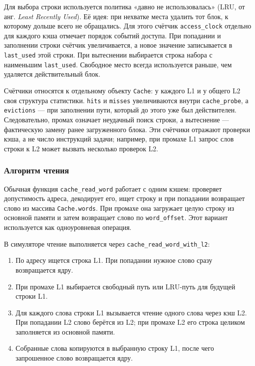 \documentclass[12pt,a4paper]{article}
\begin{document}
Для выбора строки используется политика «давно не использовалась» (LRU, от анг. \textit{Least Recently Used}). Её идея: при нехватке места удалить тот блок, к которому дольше всего не обращались. Для этого счётчик \texttt{access\_clock} отдельно для каждого кэша отмечает порядок событий доступа. При попадании и заполнении строки счётчик увеличивается, а новое значение записывается в \texttt{last\_used} этой строки. При вытеснении выбирается строка набора с наименьшим \texttt{last\_used}. Свободное место всегда используется раньше, чем удаляется действительный блок.

Счётчики относятся к отдельному объекту \texttt{Cache}: у каждого L1 и у общего L2 своя структура статистики. \texttt{hits} и \texttt{misses} увеличиваются внутри \texttt{cache\_probe}, а \texttt{evictions} --- при заполнении пути, который до этого уже был действителен. Следовательно, промах означает неудачный поиск строки, а вытеснение --- фактическую замену ранее загруженного блока. Эти счётчики отражают проверки кэша, а не число инструкций задачи; например, при промахе L1 запрос слов строки к L2 может вызвать несколько проверок L2.

\subsubsection{Алгоритм чтения}

Обычная функция \texttt{cache\_read\_word} работает с одним кэшем: проверяет допустимость адреса, декодирует его, ищет строку и при попадании возвращает слово из массива \texttt{Cache.words}. При промахе она загружает целую строку из основной памяти и затем возвращает слово по \texttt{word\_offset}. Этот вариант используется как одноуровневая операция.

В симуляторе чтение выполняется через \texttt{cache\_read\_word\_with\_l2}:

\begin{enumerate}[leftmargin=2em]
    \item По адресу ищется строка L1. При попадании нужное слово сразу возвращается ядру.
    \item При промахе L1 выбирается свободный путь или LRU-путь для будущей строки L1.
    \item Для каждого слова строки L1 вызывается чтение одного слова через кэш L2. При попадании L2 слово берётся из L2; при промахе L2 его строка целиком заполняется из основной памяти.
    \item Собранные слова копируются в выбранную строку L1, после чего запрошенное слово возвращается ядру.
\end{enumerate}
\end{document}
